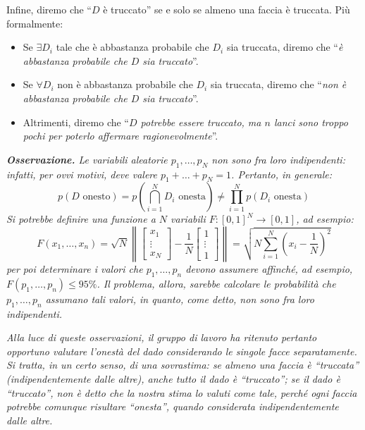 \documentclass{article}
\begin{document}
\begin{appendices}
Infine, diremo che “$D$ è truccato” se e solo se almeno una faccia è truccata. Più formalmente:
\begin{itemize}
    \item Se $\exists D_i$ tale che è abbastanza probabile che $D_i$ sia truccata,
          diremo che “\emph{è abbastanza probabile che $D$ sia truccato}”.
    \item Se $\forall D_i$ non è abbastanza probabile che $D_i$ sia truccata,
          diremo che “\emph{non è abbastanza probabile che $D$ sia truccato}”.
    \item Altrimenti, diremo che
          “\emph{$D$ potrebbe essere truccato, ma $n$ lanci sono troppo pochi per poterlo
          affermare ragionevolmente}”.
\end{itemize}

\emph{\textbf{Osservazione.} Le variabili aleatorie $p_1,\dots,p_N$ non sono fra loro indipendenti:
infatti, per ovvi motivi, deve valere $p_1+\dots+p_N = 1$. Pertanto, in generale:}
\[p(D\text{ onesto})=p\left(\bigcap_{i=1}^N D_i\text{ onesta}\right)
\ne\prod_{i=1}^{N}p(D_i\text{ onesta})\]
\emph{Si potrebbe definire una funzione a $N$ variabili
$F:\left[0,1\right]^N\longrightarrow\left[0,1\right]$, ad esempio:}
\[F(x_1,\dots,x_n) = \sqrt{N}\left\lVert
\begin{bmatrix}x_1\\\vdots\\x_N\end{bmatrix} - \frac{1}{N}\begin{bmatrix}1\\\vdots\\1\end{bmatrix}
\right\rVert = \sqrt{N\sum_{i=1}^{N}\left(x_i-\frac{1}{N}\right)^2}\]
\emph{per poi determinare i valori che $p_1,\dots,p_n$ devono assumere affinché, ad esempio,
$F(p_1,\dots,p_n)\le95\%$. Il problema, allora, sarebbe calcolare le probabilità che
$p_1,\dots,p_n$ assumano tali valori, in quanto, come detto, non sono fra loro indipendenti.}

\emph{Alla luce di queste osservazioni, il gruppo di lavoro ha ritenuto pertanto
opportuno valutare l'onestà del dado considerando le singole facce separatamente.
Si tratta, in un certo senso, di una sovrastima: se almeno una faccia è “truccata”
(indipendentemente dalle altre), anche tutto il dado è “truccato”; se il dado è
“truccato”, non è detto che la nostra stima lo valuti come tale, perché ogni faccia
potrebbe comunque risultare “onesta”, quando considerata indipendentemente dalle
altre.}


\end{appendices}
\end{document}
